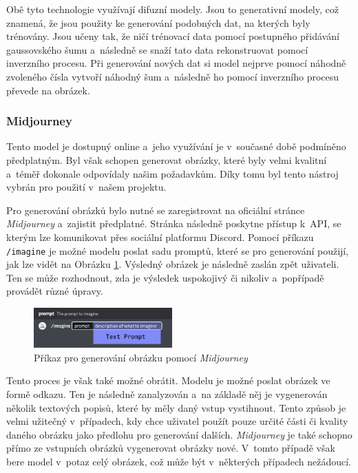 Obě tyto technologie využívají difuzní modely. Jsou to generativní modely, což znamená, že jsou použity ke generování podobných dat, na kterých byly trénovány. Jsou učeny tak, že ničí trénovací data pomocí postupného přidávání gaussovského šumu a~následně se snaží tato data rekonstruovat pomocí inverzního procesu. Při generování nových dat si model nejprve pomocí náhodně zvoleného čísla vytvoří náhodný šum a~následně ho pomocí inverzního procesu převede na obrázek.

\subsubsection*{Midjourney}
Tento model je dostupný online a~jeho využívání je v~současné době podmíněno předplatným. Byl však schopen generovat obrázky, které byly velmi kvalitní a~téměř dokonale odpovídaly našim požadavkům. Díky tomu byl tento nástroj vybrán pro použití v~našem projektu.

Pro generování obrázků bylo nutné se zaregistrovat na oficiální stránce \textit{Midjourney} a~zajistit předplatné. Stránka následně poskytne přístup k~API, se kterým lze komunikovat přes sociální platformu Discord. Pomocí příkazu \texttt{/imagine} je možné modelu poslat sadu promptů, které se pro generování použijí, jak lze vidět na Obrázku \ref{fig:mj_prompts}. Výsledný obrázek je následně zaslán zpět uživateli. Ten se může rozhodnout, zda je výsledek uspokojivý či nikoliv a~popřípadě provádět různé úpravy.

\begin{figure}[H]
    \centering
    \includegraphics[width=0.475\textwidth]{resources/figures/midjourney_prompts.png}
    \caption{Příkaz pro generování obrázku pomocí \textit{Midjourney} \cite{midjourney}}
    \label{fig:mj_prompts}
\end{figure}

Tento proces je však také možné obrátit. Modelu je možné poslat obrázek ve formě odkazu. Ten je následně zanalyzován a~na základě něj je vygenerován několik textových popisů, které by měly daný vstup vystihnout. Tento způsob je velmi užitečný v~případech, kdy chce uživatel použít pouze určité části či kvality daného obrázku jako předlohu pro generování dalších. \textit{Midjourney} je také schopno přímo ze vstupních obrázků vygenerovat obrázky nové. V~tomto případě však bere model v~potaz celý obrázek, což může být v~některých případech nežádoucí.

